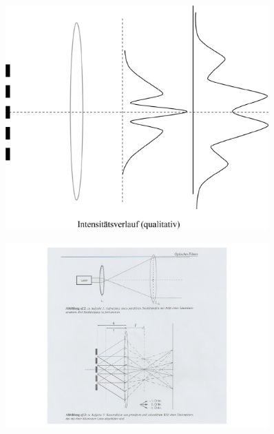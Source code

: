 \documentclass[a4paper,10pt]{scrartcl}
\begin{document}
					\begin{figure}[h]
\centering
\includegraphics[width=0.9\textwidth]{./Bilder/ofa52}

\end{figure}					
					\begin{figure}[h]
\centering
\includegraphics[width=0.9\textwidth]{./Bilder/ofa5}

\end{figure}
\FloatBarrier
		\\
		\\
\end{document}
